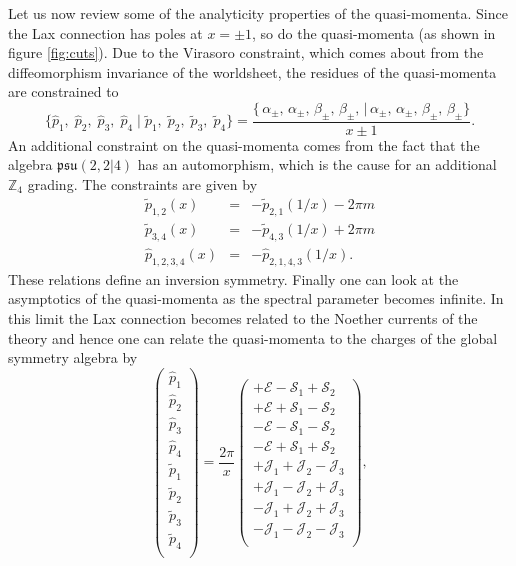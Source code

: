 Let us now review some of the analyticity properties of the quasi-momenta. 
Since the Lax connection has poles at $x = \pm 1$, so do the quasi-momenta (as shown in figure \ref{fig:cuts}). 
Due to the Virasoro constraint, which comes about from the diffeomorphism invariance of the worldsheet, the residues of the quasi-momenta are constrained to
\begin{equation}
	\label{eq:residue_sync}
	\{ \hat{p}_1, \; \hat{p}_2, \; \hat{p}_3, \; \hat{p}_4 \; | \; \tilde{p}_1, \; \tilde{p}_2, \; \tilde{p}_3, \; \tilde{p}_4 \} = \frac{\{ \, \alpha_{\pm}, \, \alpha_{\pm}, \, \beta_{\pm}, \, \beta_{\pm}, \, | \, \alpha_{\pm}, \, \alpha_{\pm}, \, \beta_{\pm}, \, \beta_{\pm} \}}{x \pm 1}.
\end{equation}
An additional constraint on the quasi-momenta comes from the fact that the algebra $\mathfrak{psu(2,2|4)}$ has an automorphism, which is the cause for an additional $\mathbb{Z}_4$ grading. 
The constraints are given by \cite{sakura}
\begin{eqnarray}
	\label{eq:quasi_inversion}
	\tilde{p}_{1,2}(x) & = & -\tilde{p}_{2,1}(1/x) - 2 \pi m \nonumber \\
	\tilde{p}_{3,4}(x) & = & -\tilde{p}_{4,3}(1/x) + 2 \pi m \nonumber \\
	\hat{p}_{1,2,3,4}(x) & = & -\hat{p}_{2,1,4,3}(1/x).
\end{eqnarray}
These relations define an inversion symmetry. 
Finally one can look at the asymptotics of the quasi-momenta as the spectral parameter becomes infinite. In this limit the Lax connection becomes related to the Noether currents of the theory and hence one can relate the quasi-momenta to the charges of the global symmetry algebra by \cite{algebraic_curve}
\begin{equation}
\left(
\begin{array}{c}
  \hat{p}_1 \\
  \hat{p}_2 \\
  \hat{p}_3 \\
  \hat{p}_4 \\
  \hline
  \tilde{p}_1 \\
  \tilde{p}_2 \\
  \tilde{p}_3 \\
  \tilde{p}_4 \\
\end{array}
\right) = \frac{2 \pi}{x}
\left(
\begin{array}{c}
  + \mathcal{E} - \mathcal{S}_1 + \mathcal{S}_2 \\
  + \mathcal{E} + \mathcal{S}_1 - \mathcal{S}_2 \\
  - \mathcal{E} - \mathcal{S}_1 - \mathcal{S}_2 \\
  - \mathcal{E} + \mathcal{S}_1 + \mathcal{S}_2 \\
  \hline
  + \mathcal{J}_1 + \mathcal{J}_2 - \mathcal{J}_3 \\
  + \mathcal{J}_1 - \mathcal{J}_2 + \mathcal{J}_3 \\
  - \mathcal{J}_1 + \mathcal{J}_2 + \mathcal{J}_3 \\
  - \mathcal{J}_1 - \mathcal{J}_2 - \mathcal{J}_3 \\
\end{array}
\right),
\label{eq:quasi_asymptotics}
\end{equation}
